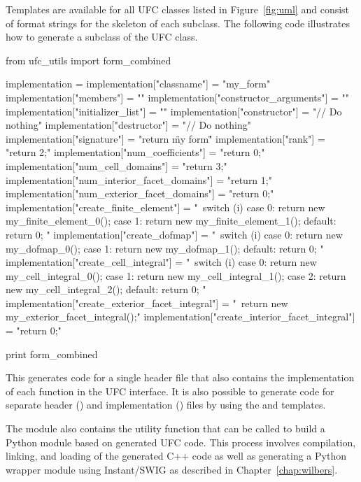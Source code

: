 Templates are available for all UFC classes listed in
Figure~\ref{fig:uml} and consist of format strings for the skeleton of
each subclass. The following code illustrates how to generate a
subclass of the UFC  class.

\begin{c++}
from ufc_utils import form_combined

implementation = {}
implementation["classname"] = "my_form"
implementation["members"] = ""
implementation["constructor_arguments"] = ""
implementation["initializer_list"] = ""
implementation["constructor"] = "// Do nothing"
implementation["destructor"] = "// Do nothing"
implementation["signature"] = "return \"my form\""
implementation["rank"] = "return 2;"
implementation["num_coefficients"] = "return 0;"
implementation["num_cell_domains"] = "return 3;"
implementation["num_interior_facet_domains"] = "return 1;"
implementation["num_exterior_facet_domains"] = "return 0;"
implementation["create_finite_element"] = "\
switch (i)
{
case 0:
  return new my_finite_element_0();
case 1:
  return new my_finite_element_1();
default:
  return 0;
}"
implementation["create_dofmap"] = "\
switch (i)
{
case 0:
  return new my_dofmap_0();
case 1:
  return new my_dofmap_1();
default:
  return 0;
}"
implementation["create_cell_integral"] = "\
switch (i)
{
case 0:
  return new my_cell_integral_0();
case 1:
  return new my_cell_integral_1();
case 2:
  return new my_cell_integral_2();
default:
  return 0;
}"
implementation["create_exterior_facet_integral"] = "\
return new my_exterior_facet_integral();"
implementation["create_interior_facet_integral"] = "return 0;"

print form_combined %
\end{c++}

This generates code for a single header file that also contains the
implementation of each function in the UFC  interface. It is
also possible to generate code for separate header () and
implementation () files by using the  and
\emp{form\_implementation} templates.

The \emp{ufc\_utils} module also contains the utility function
\emp{build\_ufc\_module} that can be called to build a Python module
based on generated UFC code. This process involves compilation,
linking, and loading of the generated C++ code as well as generating a
Python wrapper module using Instant/SWIG as described in
Chapter~\ref{chap:wilbers}.

